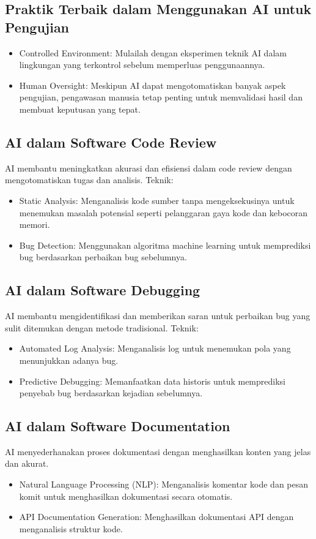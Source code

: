 \documentclass{article}
\begin{document}
\subsection{Praktik Terbaik dalam Menggunakan AI untuk Pengujian}
\begin{itemize}
    \item Controlled Environment: Mulailah dengan eksperimen teknik AI dalam lingkungan yang terkontrol sebelum memperluas penggunaannya.
    \item Human Oversight: Meskipun AI dapat mengotomatiskan banyak aspek pengujian, pengawasan manusia tetap penting untuk memvalidasi hasil dan membuat keputusan yang tepat.
\end{itemize}

\subsection{AI dalam Software Code Review}
AI membantu meningkatkan akurasi dan efisiensi dalam code review dengan mengotomatiskan tugas dan analisis. Teknik:
\begin{itemize}
    \item Static Analysis: Menganalisis kode sumber tanpa mengeksekusinya untuk menemukan masalah potensial seperti pelanggaran gaya kode dan kebocoran memori.
    \item Bug Detection: Menggunakan algoritma machine learning untuk memprediksi bug berdasarkan perbaikan bug sebelumnya.
\end{itemize}

\subsection{AI dalam Software Debugging}
AI membantu mengidentifikasi dan memberikan saran untuk perbaikan bug yang sulit ditemukan dengan metode tradisional. Teknik:
\begin{itemize}
    \item Automated Log Analysis: Menganalisis log untuk menemukan pola yang menunjukkan adanya bug.
    \item Predictive Debugging: Memanfaatkan data historis untuk memprediksi penyebab bug berdasarkan kejadian sebelumnya.
\end{itemize}

\subsection{AI dalam Software Documentation}
AI menyederhanakan proses dokumentasi dengan menghasilkan konten yang jelas dan akurat.
\begin{itemize}
    \item Natural Language Processing (NLP): Menganalisis komentar kode dan pesan komit untuk menghasilkan dokumentasi secara otomatis.
    \item API Documentation Generation: Menghasilkan dokumentasi API dengan menganalisis struktur kode.
\end{itemize}
\end{document}
